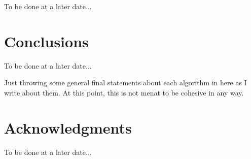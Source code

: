 \documentclass{sig-alternate}
\begin{document}
To be done at a later date...


\section{Conclusions}
\label{sec:conclusions}

To be done at a later date...

Just throwing some general final statements about each algorithm in here as I write about
them. At this point, this is not menat to be cohesive in any way.


\section*{Acknowledgments}
\label{sec:acknowledgments}

To be done at a later date...



  
\end{document}
